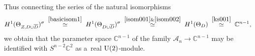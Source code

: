 Thus connecting the series of the natural isomorphisms
\begin{gather}
\label{isom49}
H^1(\Theta_{Z,D\cup\overline D})^{\sigma}
\; \stackrel{\eqref{basicisom1}}{\simeq}
\;
H^1(\Theta_{D\cup\overline D})^{\sigma}
\; \stackrel{\eqref{isom001}\&\eqref{isom002}}{\simeq}
\;
H^1(\Theta_D)
\;\stackrel{\eqref{ks001}}{\simeq}
\;
\mathbb{C}^{n-1},
\end{gather}
we obtain that the parameter space $\mathbb{C}^{n-1}$ of the family $\mathscr A_n\to\mathbb{C}^{n-1}$ may be
identif\/ied with $S^{n-2}\mathbb{C}^2$ as a~real ${\rm{U}}(2)$-module.
